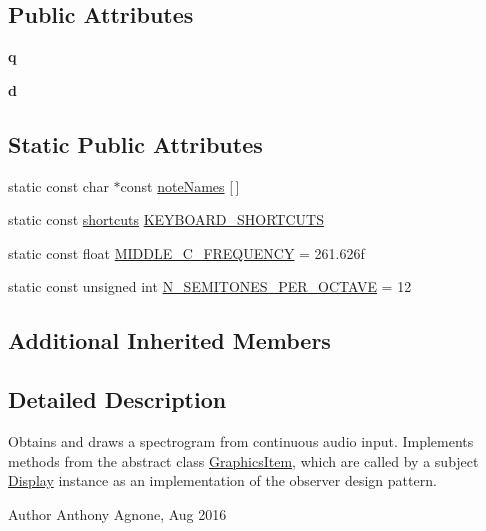 \subsection*{Public Attributes}
\begin{DoxyCompactItemize}
\item 
\mbox{\label{structSpectrogramVisualizer_add6b6c6e7a1768bd6fef3256f1cb26bc}} 
{\bfseries q}
\item 
\mbox{\label{structSpectrogramVisualizer_a969c09495e18bec03ba7145b967b6cf7}} 
{\bfseries d}
\end{DoxyCompactItemize}
\subsection*{Static Public Attributes}
\begin{DoxyCompactItemize}
\item 
static const char $\ast$const \mbox{\hyperlink{structSpectrogramVisualizer_ad833647df19d8ae0eb2e47efe989d1d9}{note\+Names}} \mbox{[}$\,$\mbox{]}
\item 
static const \mbox{\hyperlink{structSpectrogramVisualizer_1_1shortcuts}{shortcuts}} \mbox{\hyperlink{structSpectrogramVisualizer_a20eb03afddbbde072d82b1efe675b0f3}{K\+E\+Y\+B\+O\+A\+R\+D\+\_\+\+S\+H\+O\+R\+T\+C\+U\+TS}}
\item 
static const float \mbox{\hyperlink{structSpectrogramVisualizer_adfe2ed143313d59d7c118cadec1460b9}{M\+I\+D\+D\+L\+E\+\_\+\+C\+\_\+\+F\+R\+E\+Q\+U\+E\+N\+CY}} = 261.\+626f
\item 
static const unsigned int \mbox{\hyperlink{structSpectrogramVisualizer_affbdeff0d7b800feb17aab0a367222da}{N\+\_\+\+S\+E\+M\+I\+T\+O\+N\+E\+S\+\_\+\+P\+E\+R\+\_\+\+O\+C\+T\+A\+VE}} = 12
\end{DoxyCompactItemize}
\subsection*{Additional Inherited Members}


\subsection{Detailed Description}
Obtains and draws a spectrogram from continuous audio input. Implements methods from the abstract class \mbox{\hyperlink{classGraphicsItem}{Graphics\+Item}}, which are called by a subject \mbox{\hyperlink{classDisplay}{Display}} instance as an implementation of the observer design pattern. \begin{DoxyAuthor}{Author}
Anthony Agnone, Aug 2016 
\end{DoxyAuthor}


